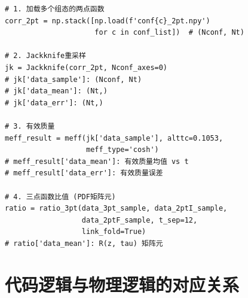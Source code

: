 \documentclass[11pt,a4paper]{ctexart}
\begin{document}
\begin{codebox}
\begin{lstlisting}[style=python]
# 1. 加载多个组态的两点函数
corr_2pt = np.stack([np.load(f'conf{c}_2pt.npy')
                     for c in conf_list])  # (Nconf, Nt)

# 2. Jackknife重采样
jk = Jackknife(corr_2pt, Nconf_axes=0)
# jk['data_sample']: (Nconf, Nt)
# jk['data_mean']: (Nt,)
# jk['data_err']: (Nt,)

# 3. 有效质量
meff_result = meff(jk['data_sample'], alttc=0.1053,
                   meff_type='cosh')
# meff_result['data_mean']: 有效质量均值 vs t
# meff_result['data_err']: 有效质量误差

# 4. 三点函数比值 (PDF矩阵元)
ratio = ratio_3pt(data_3pt_sample, data_2ptI_sample,
                  data_2ptF_sample, t_sep=12,
                  link_fold=True)
# ratio['data_mean']: R(z, tau) 矩阵元
\end{lstlisting}
\end{codebox}

\section{代码逻辑与物理逻辑的对应关系}
\end{document}

